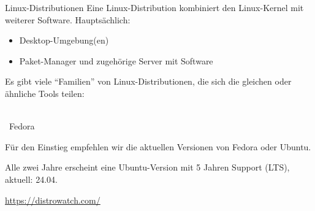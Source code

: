 \begin{frame}{Linux-Distributionen}
    Eine Linux-Distribution kombiniert den Linux-Kernel mit weiterer Software. Hauptsächlich:
    \begin{itemize}
        \item Desktop-Umgebung(en)
        \item Paket-Manager und zugehörige Server mit Software
    \end{itemize}

    Es gibt viele \enquote{Familien} von Linux-Distributionen, die sich die gleichen oder ähnliche Tools teilen:
    \begin{center}
        \hspace{0.5cm} \\[1\baselineskip]

        ~{\Huge Fedora}
        \hspace{0.5cm}
    \end{center}

    Für den Einstieg empfehlen wir die aktuellen Versionen von Fedora oder Ubuntu.

    Alle zwei Jahre erscheint eine Ubuntu-Version mit 5 Jahren Support (LTS), aktuell: 24.04.

    \url{https://distrowatch.com/}
\end{frame}

